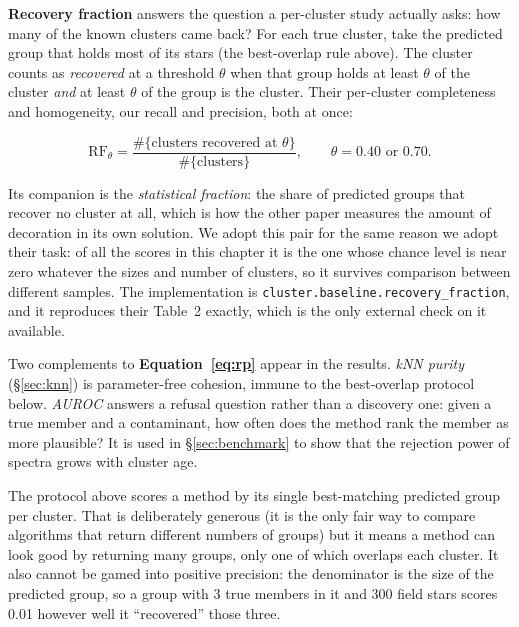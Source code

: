 \textbf{Recovery fraction} \citep{Casamiquela:21} answers the question a
per-cluster study actually asks: how many of the known clusters came back? For
each true cluster, take the predicted group that holds most of its stars (the
best-overlap rule above). The cluster counts as \emph{recovered} at a threshold
$\theta$ when that group holds at least $\theta$ of the cluster \emph{and} at
least $\theta$ of the group is the cluster. Their per-cluster completeness and
homogeneity, our recall and precision, both at once:

\begin{equation}
\mathrm{RF}_{\theta} = \frac{\#\{\text{clusters recovered at } \theta\}}{\#\{\text{clusters}\}},
\qquad \theta = 0.40 \text{ or } 0.70 .
\label{eq:rf}
\end{equation}

Its companion is the \emph{statistical fraction}: the share of predicted groups
that recover no cluster at all, which is how the other paper measures the amount
of decoration in its own solution. We adopt this pair for the same reason we
adopt their task: of all the scores in this chapter it is the one whose chance
level is near zero whatever the sizes and number of clusters, so it survives
comparison between different samples. The implementation is
\texttt{cluster.baseline.recovery\_fraction}, and it reproduces their Table~2
exactly, which is the only external check on it available.

Two complements to \textbf{Equation~\ref{eq:rp}} appear in the results.
\emph{kNN purity} (\S\ref{sec:knn}) is parameter-free cohesion, immune to the
best-overlap protocol below. \emph{AUROC} answers a refusal question rather
than a discovery one: given a true member and a contaminant, how often does
the method rank the member as more plausible? It is used in
\S\ref{sec:benchmark} to show that the rejection power of spectra grows with
cluster age.

\begin{issues} The protocol above scores a
method by its single best-matching predicted group per cluster. That is
deliberately generous (it is the only fair way to compare algorithms that
return different numbers of groups) but it means a method can look good by
returning many groups, only one of which overlaps each cluster. It also cannot
be gamed into positive precision: the denominator is the size of the predicted
group, so a group with 3 true members in it and 300 field stars scores 0.01
however well it ``recovered'' those three.
\end{issues}

